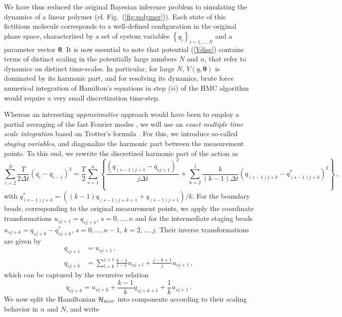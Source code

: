 \documentclass[11pt]{article}
\theoremstyle{definition}
\newcommand{\bt}{\pmb\theta}
\begin{document}
We have thus reduced the original Bayesian inference problem to simulating the dynamics of a linear polymer (cf. Fig.~(\ref{fig:polymer})). Each state of this fictitious molecule corresponds to a well-defined configuration in the original phase space, characterized by a set of system variables $\left\{q_i\right\}_{i=1,\dots,N}$ and a parameter vector $\bt$. It is now essential to note that potential (\ref{Vdisc}) contains terms of distinct scaling in the potentially large numbers $N$ and $n$, that refer to dynamics on distinct time-scales. In particular, for large $N$, $V(q,\bt)$ is dominated by its harmonic part, and for resolving its dynamics, brute force numerical integration of Hamilton's equations in step ($ii$) of the HMC algorithm would require a very small discretization time-step.

Whereas an interesting {\em approximative} approach would have been to employ a partial averaging of the fast Fourier modes \cite{doll_1985_fourier}, we will use an {\em exact multiple time scale integration} based on Trotter's formula \cite{tuckerman_1993}. For this, we introduce so-called {\it staging variables}, and diagonalize the harmonic part between the measurement points. To this end, we rewrite the discretized harmonic part of the action as
\begin{equation}
  \sum_{i=2}^{N}
  \frac{T}{2\Delta t}
  (q_i-q_{i-1})^2
  =
  \frac{T}{2}
  \sum_{s=1}^{n}\left\{
    \frac{(q_{(s-1)j+1} - q_{sj+1})^2}{j\Delta t}
    +
    \sum_{k=2}^j
    \frac{k}{(k-1)\Delta t}
    (q_{(s-1)j+k}-q^*_{(s-1)j+k})^2
  \right\}\,,
\end{equation}
with $  q^*_{(s-1)j+k}  =  ((k-1)q_{(s-1)j+k+1} + q_{(s-1)j+1} )/k$.
For the boundary beads, corresponding to the original measurement points, we apply the coordinate transformations
$  u_{sj+1} = q_{sj+1}$, $s=0,\dots,n$
and for the intermediate staging beads
$u_{sj+k} = q_{sj+k} - q^*_{sj+k}$, $s=0,\dots,n-1$, $k=2,\dots,j$. 
Their inverse transformations are given by
\begin{align}
  q_{sj+1} &= u_{sj+1}\,,
  \\
  q_{sj+k} &= \sum_{l=k}^{j+1}\frac{k-1}{l-1}u_{sj+l}
  +\frac{j-k+1}{j}u_{sj+1}\,,
\end{align}
which can be captured by the recursive relation
\begin{equation}
  q_{sj+k} = u_{sj+k} + \frac{k-1}{k} q_{sj+k+1}+ \frac{1}{k}u_{sj+1} \,.
\end{equation}
We now split the Hamiltonian $\mathcal{H}_{\mbox{\tiny HMC}}$ into components according to their scaling behavior in $n$ and $N$, and write
\end{document}
